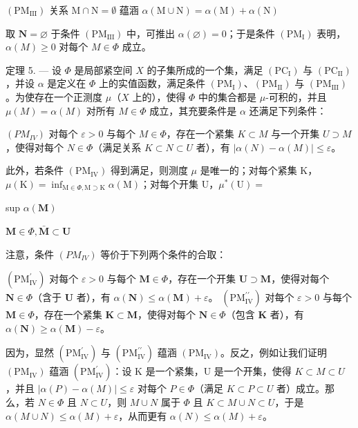 \((\mathrm{PM}_{\mathrm{III}})\) 关系 \(\mathrm{M}\cap \mathrm{N} = \emptyset\) 蕴涵 \(\alpha (\mathrm{M}\cup \mathrm{N}) = \alpha (\mathrm{M}) + \alpha (\mathrm{N})\)

取 \(\mathbf{N} = \varnothing\) 于条件 \((\mathrm{PM}_{\mathrm{III}})\) 中，可推出 \(\alpha(\varnothing) = 0\)；于是条件 \((\mathrm{PM}_{\mathrm{I}})\) 表明，\(\alpha(M) \geqslant 0\) 对每个 \(M \in \Phi\) 成立。

定理 5. --- 设 \(\Phi\) 是局部紧空间 \(X\) 的子集所成的一个集，满足 \((\mathrm{PC}_{\mathrm{I}})\) 与 \((\mathrm{PC}_{\mathrm{II}})\)，并设 \(\alpha\) 是定义在 \(\Phi\) 上的实值函数，满足条件 \((\mathrm{PM}_{\mathrm{I}})\)、\((\mathrm{PM}_{\mathrm{II}})\) 与 \((\mathrm{PM}_{\mathrm{III}})\)。为使存在一个正测度 \(\mu\)（\(X\) 上的），使得 \(\Phi\) 中的集合都是 \(\mu\)-可积的，并且 \(\mu(M) = \alpha(M)\) 对所有 \(M \in \Phi\) 成立，其充要条件是 \(\alpha\) 还满足下列条件：

\((PM_{IV})\) 对每个 \(\varepsilon > 0\) 与每个 \(M \in \Phi\)，存在一个紧集 \(K \subset M\) 与一个开集 \(U \supset M\)，使得对每个 \(N \in \Phi\)（满足关系 \(K \subset N \subset U\) 者），有 \(|\alpha(N) - \alpha(M)| \leqslant \varepsilon\)。

此外，若条件 \((\mathrm{PM}_{\mathrm{IV}})\) 得到满足，则测度 \(\mu\) 是唯一的；对每个紧集 K，\(\mu(\mathrm{K}) = \inf_{\mathrm{M} \in \Phi, \mathrm{M} \supset \mathrm{K}} \alpha(\mathrm{M})\)；对每个开集 U，\(\mu^{*}(\mathrm{U}) =\)

sup \(\alpha (\mathbf{M})\)

\(\mathbf{M}\in \Phi ,\bar{\mathbf{M}}\subset \mathbf{U}\)

注意，条件 \((PM_{IV})\) 等价于下列两个条件的合取：

\((\mathrm{PM}_{\mathrm{IV}}^{\prime})\) 对每个 \(\varepsilon > 0\) 与每个 \(\mathbf{M} \in \Phi\)，存在一个开集 \(\mathbf{U} \supset \mathbf{M}\)，使得对每个 \(\mathbf{N} \in \Phi\)（含于 \(\mathbf{U}\) 者），有 \(\alpha(\mathbf{N}) \leqslant \alpha(\mathbf{M}) + \varepsilon\)。 \((\mathrm{PM}_{\mathrm{IV}}^{\prime \prime})\) 对每个 \(\varepsilon > 0\) 与每个 \(\mathbf{M} \in \Phi\)，存在一个紧集 \(\mathbf{K} \subset \mathbf{M}\)，使得对每个 \(\mathbf{N} \in \Phi\)（包含 \(\mathbf{K}\) 者），有 \(\alpha(\mathbf{N}) \geqslant \alpha(\mathbf{M}) - \varepsilon\)。

因为，显然 \((\mathrm{PM}_{\mathrm{IV}}^{\prime})\) 与 \((\mathrm{PM}_{\mathrm{IV}}^{\prime\prime})\) 蕴涵 \((\mathrm{PM}_{\mathrm{IV}})\)。反之，例如让我们证明 \((\mathrm{PM}_{\mathrm{IV}})\) 蕴涵 \((\mathrm{PM}_{\mathrm{IV}}^{\prime})\)：设 K 是一个紧集，U 是一个开集，使得 \(K \subset M \subset U\)，并且 \(|\alpha(P) - \alpha(M)| \leqslant \varepsilon\) 对每个 \(P \in \Phi\)（满足 \(K \subset P \subset U\) 者）成立。那么，若 \(N \in \Phi\) 且 \(N \subset U\)，则 \(M \cup N\) 属于 \(\Phi\) 且 \(K \subset M \cup N \subset U\)，于是 \(\alpha(M \cup N) \leqslant \alpha(M) + \varepsilon\)，从而更有 \(\alpha(N) \leqslant \alpha(M) + \varepsilon\)。

